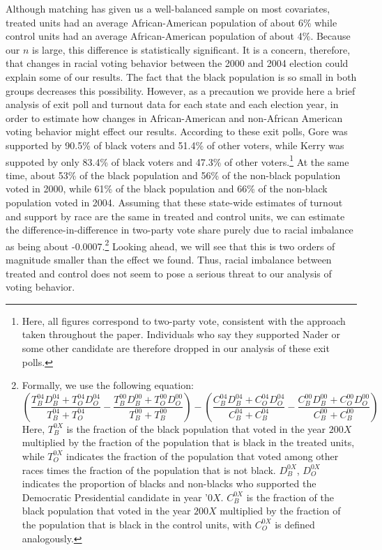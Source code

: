 Although matching has given us a well-balanced sample on most covariates, treated units had an average African-American population of about 6\% while control units had an average African-American population of about 4\%. Because our $n$ is large, this difference is statistically significant. It is a concern, therefore, that changes in racial voting behavior between the 2000 and 2004 election could explain some of our results. The fact that the black population is so small in both groups decreases this possibility. However, as a precaution we provide here a brief analysis of exit poll and turnout data for each state and each election year, in order to estimate how changes in African-American and non-African American voting behavior might effect our results. According to these exit polls, Gore was supported by 90.5\% of black voters and 51.4\% of other voters, while Kerry was suppoted by only 83.4\% of black voters and 47.3\% of other voters.\footnote{Here, all figures correspond to two-party vote, consistent with the approach taken throughout the paper. Individuals who say they supported Nader or some other candidate are therefore dropped in our analysis of these exit polls.}  At the same time, about 53\% of the black population and 56\% of the non-black population voted in 2000, while 61\% of the black population and 66\% of the non-black population voted in 2004. Assuming that these state-wide estimates of turnout and support by race are the same in treated and control units, we can estimate the difference-in-difference in two-party vote share purely due to racial imbalance as being about -0.0007.\footnote{Formally, we use the following equation: $$(\frac{ T_B^{04} D_B^{04} +  T_O^{04}  D_O^{04}}{ T_B^{04} +  T_O^{04}} - \frac{ T_B^{00} D_B^{00} +  T_O^{00}  D_O^{00}}{ T_B^{00} +  T_B^{00}}) - (\frac{ C_B^{04} D_B^{04} +  C_O^{04}  D_O^{04}}{ C_B^{04} +  C_B^{04}} - \frac{ C_B^{00} D_B^{00} +  C_O^{00}  D_O^{00}}{ C_B^{00} +  C_B^{00}}) $$ 
Here, $T_B^{0X}$ is the fraction of the black population that voted in the year $200X$ multiplied by the fraction of the population that is black in the treated units, while $T_O^{0X}$ indicates the fraction of the population that voted among other races times the fraction of the population that is not black.  $D_B^{0X}$, $D_O^{0X}$ indicates the proportion of blacks and non-blacks who supported the Democratic Presidential candidate in year '$0X$. $C_B^{0X}$ is the fraction of the black population that voted in the year $200X$ multiplied by the fraction of the population that is black in the control units, with $C_O^{0X}$ is defined analogously.} Looking ahead, we will see that this is two orders of magnitude smaller than the effect we found. Thus, racial imbalance between treated and control does not seem to pose a serious threat to our analysis of voting behavior.
